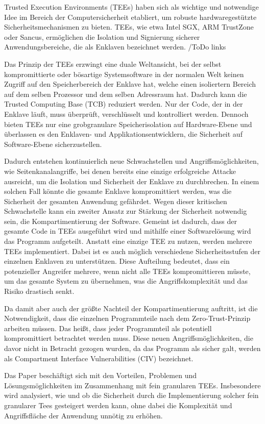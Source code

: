 Trusted Execution Environments (TEEs) haben sich als wichtige und notwendige Idee im Bereich der Computersicherheit etabliert, um robuste hardwaregestützte Sicherheitsmechanismen zu bieten. TEEs, wie etwa Intel SGX, ARM TrustZone oder Sancus, ermöglichen die Isolation und Signierung sicherer Anwendungsbereiche, die als Enklaven bezeichnet werden. /ToDo links

Das Prinzip der TEEs erzwingt eine duale Weltansicht, bei der selbst kompromittierte oder bösartige Systemsoftware in der normalen Welt keinen Zugriff auf den Speicherbereich der Enklave hat, welche einen isoliertern Bereich auf dem selben Prozessor und dem selben Adressraum hat. Dadurch kann die Trusted Computing Base (TCB) reduziert werden. Nur der Code, der in der Enklave läuft, muss überprüft, verschlüsselt und kontrolliert werden. Dennoch bieten TEEs nur eine grobgranulare Speicherisolation auf Hardware-Ebene und überlassen es den Enklaven- und Applikationsentwicklern, die Sicherheit auf Software-Ebene sicherzustellen. 

Dadurch entstehen kontinuierlich neue Schwachstellen und Angriffsmöglichkeiten, wie Seitenkanalangriffe, bei denen bereits eine einzige erfolgreiche Attacke ausreicht, um die Isolation und Sicherheit der Enklave zu durchbrechen. In einem solchen Fall könnte die gesamte Enklave kompromittiert werden, was die Sicherheit der gesamten Anwendung gefährdet. Wegen dieser kritischen Schwachstelle kann ein zweiter Ansatz zur Stärkung der Sicherheit notwendig sein, die Kompartimentierung der Software. Gemeint ist dadurch, dass der gesamte Code in TEEs ausgeführt wird und mithilfe einer Softwarelösung wird das Programm aufgeteilt. Anstatt eine einzige TEE zu nutzen, werden mehrere TEEs implementiert. Dabei ist es auch möglich verschiedene Sicherheitsstufen der einzelnen Enklaven zu unterstützen. Diese Aufteilung bedeutet, dass ein potenzieller Angreifer mehrere, wenn nicht alle TEEs kompromittieren müsste, um das gesamte System zu übernehmen, was die Angriffskomplexität und das Risiko drastisch senkt.

Da damit aber auch der größte Nachteil der Kompartimentierung auftritt, ist die Notwendigkeit, dass die einzelnen Programmteile nach dem Zero-Trust-Prinzip arbeiten müssen. Das heißt, dass jeder Programmteil als potentiell kompromittiert betrachtet werden muss. Diese neuen Angriffsmöglichkeiten, die davor nicht in Betracht gezogen wurden, da das Programm als sicher galt, werden als Compartment Interface Vulnerabilities (CIV) bezeichnet.

Das Paper beschäftigt sich mit den Vorteilen, Problemen und Lösungsmöglichkeiten im Zusammenhang mit fein granularen TEEs. Insbesondere wird analysiert, wie und ob die Sicherheit durch die Implementierung solcher fein granularer Tees gesteigert werden kann, ohne dabei die Komplexität und Angriffsfläche der Anwendung unnötig zu erhöhen.

